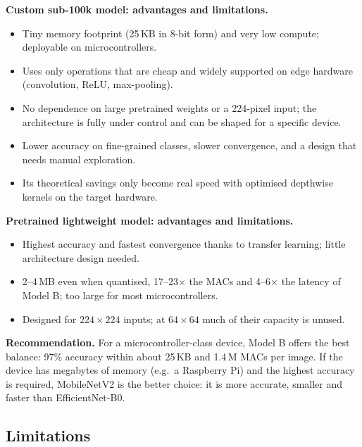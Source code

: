 \documentclass[11pt, a4paper]{article}
\begin{document}
\textbf{Custom sub-100k model: advantages and limitations.}
\begin{itemize}
    \item[+] Tiny memory footprint (25\,KB in 8-bit form) and very low compute; deployable on microcontrollers.
    \item[+] Uses only operations that are cheap and widely supported on edge hardware (convolution, ReLU, max-pooling).
    \item[+] No dependence on large pretrained weights or a 224-pixel input; the architecture is fully under control
          and can be shaped for a specific device.
    \item[--] Lower accuracy on fine-grained classes, slower convergence, and a design that needs manual exploration.
    \item[--] Its theoretical savings only become real speed with optimised depthwise kernels on the target hardware.
\end{itemize}

\textbf{Pretrained lightweight model: advantages and limitations.}
\begin{itemize}
    \item[+] Highest accuracy and fastest convergence thanks to transfer learning; little architecture design needed.
    \item[--] 2--4\,MB even when quantised, 17--23$\times$ the MACs and 4--6$\times$ the latency of Model B; too large
          for most microcontrollers.
    \item[--] Designed for $224 \times 224$ inputs; at $64 \times 64$ much of their capacity is unused.
\end{itemize}

\textbf{Recommendation.} For a microcontroller-class device, Model B offers the best balance: 97\% accuracy within
about 25\,KB and 1.4\,M MACs per image. If the device has megabytes of memory (e.g.\ a Raspberry Pi) and the highest
accuracy is required, MobileNetV2 is the better choice: it is more accurate, smaller and faster than EfficientNet-B0.

\subsection{Limitations}
\end{document}
